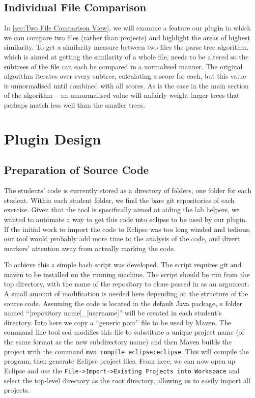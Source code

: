 \section{Individual File Comparison}
\label{sec:SimilarityAnalysis}
In \cref{sec:Two File Comparison View}, we will examine a feature 
our plugin in which we can compare two files (rather than projects) and highlight
the areas of highest similarity. To get a similarity measure between two files
the parse tree algorithm, which is aimed at getting the similarity of a whole
file, needs to be altered so the subtrees of the file can each be compared in a 
normalised manner. The original algorithm iterates over every subtree, calculating
a score for each, but this value is unnormalised until combined with all scores.
As is the case in the main section of the algorithm -- an unnormalised value
will unfairly weight larger trees that perhaps match less well than the
smaller trees.

\chapter{Plugin Design}

\section{Preparation of Source Code}

The students' code is currently stored as a directory of folders, one folder for
each student. Within each student folder, we find the bare git repositories of 
each exercise. Given that the tool is specifically aimed at aiding the lab helpers,
we wanted to automate a way to get this code into eclipse to be used by our plugin.
If the initial work to import the code to Eclipse was too long winded and tedious,
our tool would probably add more time to the analysis of the code, and divert markers'
attention away from actually marking the code.

To achieve this a simple bash script was developed. The script requires git and
maven to be installed on the running machine. The script should be run from the
top directory, with the name of the repository to clone passed in as an argument.
A small amount of modification is needed here depending on the structure of the
source code. Assuming the code is located in the default Java package, a folder
named ``[repository name]\_[username]'' will be created in each student's directory.
Into here we copy a ``generic pom'' file to be used by Maven. The command line tool
sed modifies this file to substitute a unique project name (of the same format as
the new subdirectory name) and then Maven builds the project with the command 
\texttt{mvn compile eclipse:eclipse}. This will compile the program, then generate
Eclipse project files. From here, we can now open up Eclipse and use the 
\texttt{File->Import->Existing Projects into Workspace} and select the top-level
directory as the root directory, allowing us to easily import all projects.

